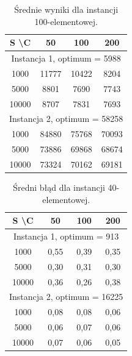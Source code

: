   \begin{table}[h!]
  \begin{center}
  \caption{Średnie wyniki dla instancji 100-elementowej.}
  \begin{tabular}{c|ccc}
    \hline
      S \textbackslash C & 50 & 100 & 200 \\
    \hline
      \multicolumn{4}{c}{Instancja 1, optimum = 5988} \\
    \hline
      1000  & 11777 & 10422 & 8204 \\
      5000  & 8801  & 7690  & 7743 \\
      10000 & 8707  & 7831  & 7693 \\
    \hline
      \multicolumn{4}{c}{Instancja 2, optimum = 58258} \\
    \hline
      1000  & 84880 & 75768 & 70093 \\
      5000  & 73886 & 69868 & 68674 \\
      10000 & 73324 & 70162 & 69181
  \end{tabular}
  \end{center}
  \end{table}

  \begin{table}[h!]
  \begin{center}
  \caption{Średni błąd dla instancji 40-elementowej.}
  \begin{tabular}{c|ccc}
    \hline
      S \textbackslash C & 50 & 100 & 200 \\
    \hline
      \multicolumn{4}{c}{Instancja 1, optimum = 913} \\
    \hline
      1000  & 0,55 & 0,39 & 0,35 \\
      5000  & 0,30 & 0,31 & 0,30 \\
      10000 & 0,36 & 0,26 & 0,38 \\
    \hline
      \multicolumn{4}{c}{Instancja 2, optimum = 16225} \\
    \hline
      1000  & 0,08 & 0,08 & 0,06 \\
      5000  & 0,06 & 0,07 & 0,06 \\
      10000 & 0,07 & 0,06 & 0,05
  \end{tabular}
  \end{center}
  \end{table}

